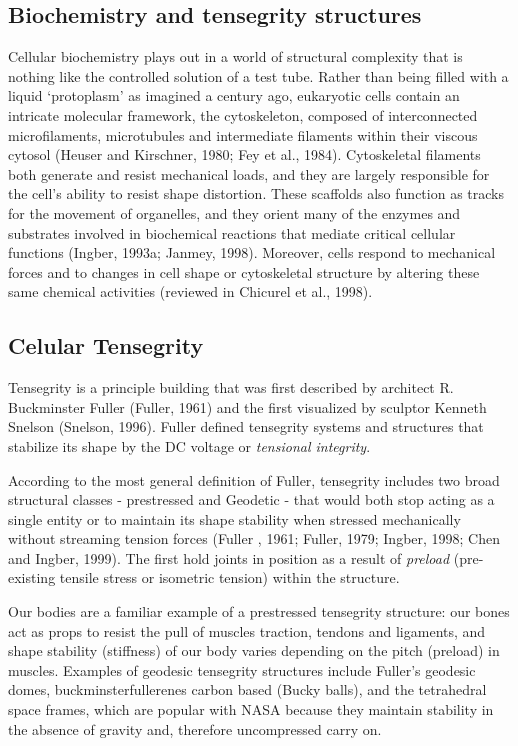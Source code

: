 
\subsection{Biochemistry and tensegrity structures}

    Cellular biochemistry plays out in a world of structural complexity that is nothing like the controlled solution of a test tube. Rather than being filled with a liquid ‘protoplasm’ as imagined a century ago, eukaryotic cells contain an intricate molecular framework, the cytoskeleton, composed of interconnected microfilaments, microtubules and intermediate filaments within their viscous cytosol (Heuser and Kirschner, 1980; Fey et al., 1984). Cytoskeletal filaments both generate and resist mechanical loads, and they are largely responsible for the cell’s ability to resist shape distortion. These scaffolds also function as tracks for the movement of organelles, and they orient many of the enzymes and substrates involved in biochemical reactions that mediate critical cellular functions (Ingber, 1993a; Janmey, 1998). Moreover, cells respond to mechanical forces and to changes in cell shape or cytoskeletal structure by altering these same chemical activities (reviewed in Chicurel et al., 1998).

\subsection{Celular Tensegrity}

    Tensegrity is a principle building that was first described by architect R. Buckminster Fuller (Fuller, 1961) and the first visualized by sculptor Kenneth Snelson (Snelson, 1996). Fuller defined tensegrity systems and structures that stabilize its shape by the DC voltage or \emph{tensional integrity}.

    According to the most general definition of Fuller, tensegrity includes two broad structural classes - prestressed and Geodetic - that would both stop acting as a single entity or to maintain its shape stability when stressed mechanically without streaming tension forces (Fuller , 1961; Fuller, 1979; Ingber, 1998; Chen and Ingber, 1999). The first hold joints in position as a result of \emph{preload}  (pre-existing tensile stress or isometric tension) within the structure.

    Our bodies are a familiar example of a prestressed tensegrity structure: our bones act as props to resist the pull of muscles traction, tendons and ligaments, and shape stability (stiffness) of our body varies depending on the pitch (preload) in muscles. Examples of geodesic tensegrity structures include Fuller's geodesic domes, buckminsterfullerenes carbon based (Bucky balls), and the tetrahedral space frames, which are popular with NASA because they maintain stability in the absence of gravity and, therefore uncompressed carry on.

